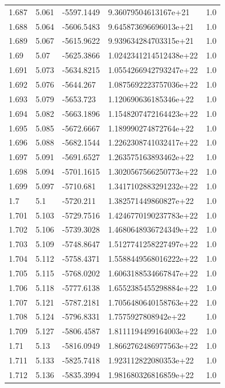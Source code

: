 \begin{tabular}{lllll}
1.687 & 5.061 & -5597.1449 & 9.36079504613167e+21 & 1.0 \\
1.688 & 5.064 & -5606.5483 & 9.645873696696013e+21 & 1.0 \\
1.689 & 5.067 & -5615.9622 & 9.939634284703315e+21 & 1.0 \\
1.69 & 5.07 & -5625.3866 & 1.0242341214512438e+22 & 1.0 \\
1.691 & 5.073 & -5634.8215 & 1.0554266942793247e+22 & 1.0 \\
1.692 & 5.076 & -5644.267 & 1.0875692223757036e+22 & 1.0 \\
1.693 & 5.079 & -5653.723 & 1.120690636185346e+22 & 1.0 \\
1.694 & 5.082 & -5663.1896 & 1.1548207472164423e+22 & 1.0 \\
1.695 & 5.085 & -5672.6667 & 1.189990274872764e+22 & 1.0 \\
1.696 & 5.088 & -5682.1544 & 1.2262308741032417e+22 & 1.0 \\
1.697 & 5.091 & -5691.6527 & 1.263575163893462e+22 & 1.0 \\
1.698 & 5.094 & -5701.1615 & 1.3020567566250773e+22 & 1.0 \\
1.699 & 5.097 & -5710.681 & 1.3417102883291232e+22 & 1.0 \\
1.7 & 5.1 & -5720.211 & 1.382571449860827e+22 & 1.0 \\
1.701 & 5.103 & -5729.7516 & 1.4246770190237783e+22 & 1.0 \\
1.702 & 5.106 & -5739.3028 & 1.4680648936724349e+22 & 1.0 \\
1.703 & 5.109 & -5748.8647 & 1.5127741258227497e+22 & 1.0 \\
1.704 & 5.112 & -5758.4371 & 1.5588449568016222e+22 & 1.0 \\
1.705 & 5.115 & -5768.0202 & 1.6063188534667847e+22 & 1.0 \\
1.706 & 5.118 & -5777.6138 & 1.6552385455298884e+22 & 1.0 \\
1.707 & 5.121 & -5787.2181 & 1.7056480640158763e+22 & 1.0 \\
1.708 & 5.124 & -5796.8331 & 1.7575927808942e+22 & 1.0 \\
1.709 & 5.127 & -5806.4587 & 1.8111194499164003e+22 & 1.0 \\
1.71 & 5.13 & -5816.0949 & 1.8662762486977563e+22 & 1.0 \\
1.711 & 5.133 & -5825.7418 & 1.923112822080353e+22 & 1.0 \\
1.712 & 5.136 & -5835.3994 & 1.981680326816859e+22 & 1.0 \\

\end{tabular}
